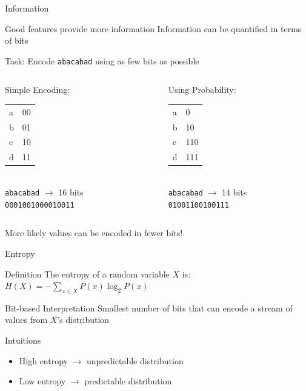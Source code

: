\documentclass[14pt]{beamer}
\begin{document}
\begin{frame}{Information}
\begin{block}{Good features provide more information}
Information can be quantified in terms of bits
\end{block}
\pause
Task: Encode \texttt{abacabad} using as few bits as possible
\pause
\medskip
\begin{columns}[t]
\begin{column}{1.8in}
Simple Encoding:
\begin{tabular}{ll}
a & 00 \\
b & 01 \\
c & 10 \\
d & 11 \\
\end{tabular} \\
\pause
\medskip
\texttt{abacabad} $\rightarrow$ 16 bits \texttt{0001001000010011}
\end{column}
\pause
\begin{column}{1.8in}
Using Probability:
\begin{tabular}{ll}
a & 0 \\
b & 10 \\
c & 110 \\
d & 111 \\
\end{tabular} \\
\pause
\medskip
\texttt{abacabad} $\rightarrow$ 14 bits \texttt{01001100100111}
\end{column}
\end{columns}
\pause
\bigskip
\alert{More likely values can be encoded in fewer bits!}
\end{frame}

\begin{frame}{Entropy}
\begin{block}{Definition}
The \alert{entropy} of a random variable $X$ is: \\
\smallskip
\tab\tab$H(X) = -\sum\limits_{x \in X}P(x)\log_2 P(x)$
\end{block}
\pause
\begin{block}{Bit-based Interpretation}
Smallest number of bits that can encode a stream of values from $X$'s distribution
\end{block}
\pause
\begin{block}{Intuitions}
\begin{itemize}
\item High entropy $\rightarrow$ unpredictable distribution
\item Low entropy $\rightarrow$ predictable distribution
\end{itemize}
\end{block}
\end{frame}
\end{document}
